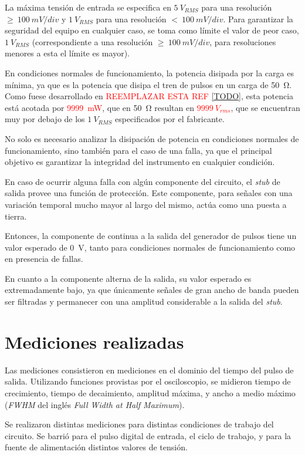 La máxima tensión de entrada se especifica en $5 \ V_{RMS}$ para una resolución
$\geq \ 100 \ mV/div$ y $1 \ V_{RMS}$ para una resolución $< \ 100 \ mV/div$.
Para garantizar la seguridad del equipo en cualquier caso, se toma como límite
el valor de peor caso, $1 \ V_{RMS}$ (correspondiente a una resolución $\geq \
100 \ mV/div$, para resoluciones menores a esta el límite es mayor).

En condiciones normales de funcionamiento, la potencia disipada por la carga es
mínima, ya que es la potencia que disipa el tren de pulsos en un carga de
\qty{50}{\ohm}. Como fuese desarrollado en \textcolor{red}{REEMPLAZAR ESTA REF
\ref{TODO}}, esta potencia está acotada por
\textcolor{red}{\qty{9999}{\milli\watt}}, que en \qty{50}{\ohm} resultan en
\textcolor{red}{$9999 \ V_{rms}$}, que se encuentran muy por debajo de los $1 \
V_{RMS}$ especificados por el fabricante.

No solo es necesario analizar la disipación de potencia en condiciones normales
de funcionamiento, sino también para el caso de una falla, ya que el principal
objetivo es garantizar la integridad del instrumento en cualquier condición.

En caso de ocurrir alguna falla con algún componente del circuito, el \textit{stub}
de salida provee una función de protección. Este componente, para señales con
una variación temporal mucho mayor al largo del mismo, actúa como una puesta a
tierra.

Entonces, la componente de continua a la salida del generador de pulsos tiene un
valor esperado de \qty{0}{\volt}, tanto para condiciones normales de 
funcionamiento como en presencia de fallas.

En cuanto a la componente alterna de la salida, su valor esperado es
extremadamente bajo, ya que únicamente señales de gran ancho de banda pueden ser
filtradas y permanecer con una amplitud considerable a la salida del 
\textit{stub}.

\section{Mediciones realizadas}

Las mediciones consistieron en mediciones en el dominio del tiempo del pulso de
salida. Utilizando funciones provistas por el osciloscopio, se midieron tiempo
de crecimiento, tiempo de decaimiento, amplitud máxima, y ancho a medio máximo
(\textit{FWHM} del inglés \textit{Full Width at Half Maximum}).

Se realizaron distintas mediciones para distintas condiciones de trabajo del
circuito. Se barrió para el pulso digital de entrada, el ciclo de trabajo, y
para la fuente de alimentación distintos valores de tensión.

